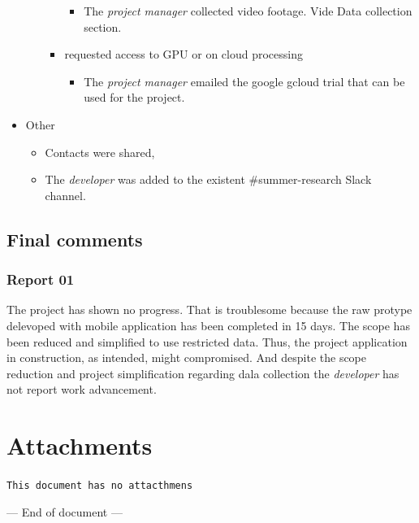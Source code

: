 \documentclass{article}
\begin{document}
\begin{itemize}
\begin{itemize}
\begin{itemize}
\begin{itemize}
\item The \emph{project manager} collected video footage. Vide Data collection section.
\end{itemize}
\item requested access to GPU or on cloud processing
\begin{itemize}
\item The \emph{project manager} emailed the google gcloud trial that can be used for the project.
\end{itemize}
\end{itemize}
\end{itemize}
\item Other
\begin{itemize}
\item Contacts were shared,

\item The \emph{developer} was added to the existent \#summer-research Slack channel.
\end{itemize}
\end{itemize}

\subsection{Final comments}
\label{sec:org80d5399}
\subsubsection{Report 01}
\label{sec:orgd0e0259}
The project has shown no progress.
That is troublesome because the raw protype delevoped with mobile application has been completed in 15 days.
The scope has been reduced and simplified to use restricted data.
Thus, the project application in construction, as intended, might compromised.
And despite the scope reduction and project simplification regarding dala collection the \emph{developer} has not report work advancement.


\section{Attachments}
\label{sec:org78362b8}
\texttt{This document has no attacthmens}

\begin{center}
--- End of document ---
\end{center}
\end{document}
